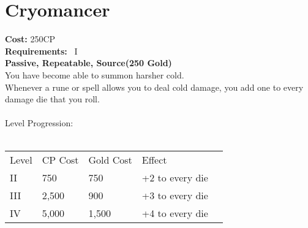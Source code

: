 \section{Cryomancer}\label{perk:cryomancer}
\textbf{Cost:} 250CP\\
\textbf{Requirements:}~ I\\
\textbf{Passive, Repeatable, Source(250 Gold)}\\
You have become able to summon harsher cold.\\
Whenever a rune or spell allows you to deal cold damage, you add one to every damage die that you roll.\\
\\
Level Progression:\\
\\
\begin{tabular}{l | l | l | l | l}
    Level & CP Cost & Gold Cost &  Effect\\
    II & 750 & 750 & +2 to every die\\
    III & 2,500 & 900 & +3 to every die\\
    IV & 5,000 & 1,500 & +4 to every die\\
\end{tabular}